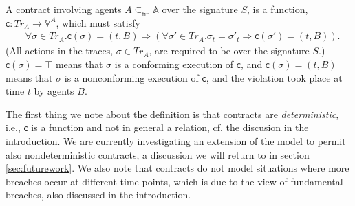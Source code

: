 \documentclass[orivec,final]{llncs-href}
\newcommand{\agentset}{\mathbb{A}}
\newcommand{\traceset}[1]{\mathit{Tr}_{#1}}
\newcommand{\verdictset}[1]{\mathbb{V}^{#1}}
\newcommand{\contractset}[1]{\traceset{#1} \to \verdictset{#1}}
\newcommand{\trace}{\sigma}
\newcommand{\finsubset}{\subseteq_{\mathrm{fin}}}
\newcommand{\conforming}{\top}
\newcommand{\contract}{\mathsf{c}}
\begin{document}
\begin{definition}[Contract]\label{def:contract}
  A contract involving agents $A \finsubset \agentset$ over the
  signature $S$, is a function, $\contract : \contractset{A}$, which
  must satisfy
  \begin{align}
    &\forall \trace \in \traceset{A}. \contract(\trace) = (t,B)
    \Rightarrow \left( \forall \trace' \in \traceset{A}. \trace_t =
      \trace'_t \Rightarrow \contract(\trace') = (t,B)\right).\label{def:contract1}
  \end{align}
  (All actions in the traces, $\trace \in \traceset{A}$, are required
  to be over the signature $S$.) $\contract(\trace) = \conforming$ means
  that $\trace$ is a conforming execution of $\contract$, and
  $\contract(\trace) = (t,B)$ means that $\trace$ is a nonconforming
  execution of $\contract$, and the violation took place at time $t$
  by agents $B$.
\end{definition}

The first thing we note about the definition is that contracts are
\emph{deterministic}, i.e., $\contract$ is a function and not in
general a relation, cf. the discusion in the introduction. We are
currently investigating an extension of the model to permit also
nondeterministic contracts, a discussion we will return to in section
\ref{sec:futurework}. We also note that contracts do not model  
situations where more breaches occur at different time points, which
is due to the view of fundamental breaches, also discussed in the
introduction. 
\end{document}

